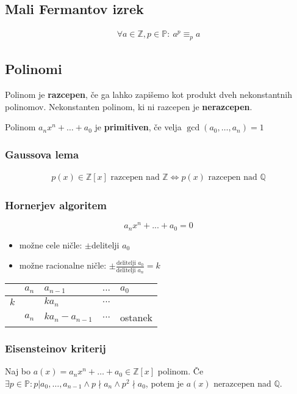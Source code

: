 \subsection*{Mali Fermantov izrek}
\begin{align*}
	\forall a \in \mathbb{Z}, p \in \mathbb{P}:\ a^p \equiv_p a
\end{align*}

\subsection*{Polinomi}
Polinom je \textbf{razcepen}, če ga lahko zapišemo kot produkt dveh nekonstantnih polinomov.
Nekonstanten polinom, ki ni razcepen je \textbf{nerazcepen}.

Polinom $a_n x^n + \dots + a_0$ je \textbf{primitiven}, če velja $\gcd(a_0, \dots, a_n) = 1$

\subsubsection*{Gaussova lema}
\begin{align*}
	p(x) \in \mathbb{Z}[x] \text{ razcepen nad } \mathbb{Z} \iff p(x) \text{ razcepen nad } \mathbb{Q}
\end{align*}

\subsubsection*{Hornerjev algoritem}
\[a_n x^n + ... + a_0 = 0\]
\begin{itemize}
	\item možne cele ničle: $\pm$delitelji $a_0$
	\item možne racionalne ničle: $\pm \frac{\text{delitelji }a_0}{\text{delitelji }a_n} = k$
\end{itemize}
\begin{center}
	\begin{tabular}{ l|l l l l}
			& $a_n$ & $a_{n-1}$ & $...$ & $a_0$ \\ \hline
		$k$ &       & $ka_n$    & $...$ & \\ \hline
			& $a_n$ & $ka_n - a_{n-1}$ & $...$ & ostanek\\
	\end{tabular}
\end{center}

\subsubsection*{Eisensteinov kriterij}
Naj bo $a(x) = a_n x^n + \dots + a_0 \in \mathbb{Z}[x]$ polinom. Če $\exists p \in \mathbb{P} : p | a_0, \dots, a_{n-1} \wedge p \nmid a_n \wedge p^2 \nmid a_0$, potem je $a(x)$ nerazcepen nad $\mathbb{Q}$.

